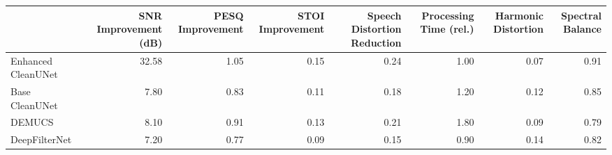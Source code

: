 \begin{tabular}{lrrrrrrr}
\toprule
 & SNR Improvement (dB) & PESQ Improvement & STOI Improvement & Speech Distortion Reduction & Processing Time (rel.) & Harmonic Distortion & Spectral Balance \\
\midrule
Enhanced CleanUNet & 32.58 & 1.05 & 0.15 & 0.24 & 1.00 & 0.07 & 0.91 \\
Base CleanUNet & 7.80 & 0.83 & 0.11 & 0.18 & 1.20 & 0.12 & 0.85 \\
DEMUCS & 8.10 & 0.91 & 0.13 & 0.21 & 1.80 & 0.09 & 0.79 \\
DeepFilterNet & 7.20 & 0.77 & 0.09 & 0.15 & 0.90 & 0.14 & 0.82 \\
\bottomrule
\end{tabular}
